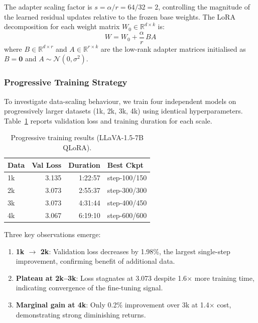 \documentclass[twocolumn]{article}
\begin{document}
The adapter scaling factor is $s = \alpha / r = 64/32 = 2$, controlling the
magnitude of the learned residual updates relative to the frozen base weights.
The LoRA decomposition for each weight matrix $W_0 \in \mathbb{R}^{d \times k}$ is:
\begin{equation}
  W = W_0 + \frac{\alpha}{r} \, B A
  \label{eq:lora}
\end{equation}
where $B \in \mathbb{R}^{d \times r}$ and $A \in \mathbb{R}^{r \times k}$ are the
low-rank adapter matrices initialised as $B = \mathbf{0}$ and $A \sim \mathcal{N}(0, \sigma^2)$.

\subsubsection{Progressive Training Strategy}
\label{sec:progressive}

To investigate data-scaling behaviour, we train four independent models on
progressively larger datasets (1k, 2k, 3k, 4k) using identical hyperparameters.
Table~\ref{tab:training_results} reports validation loss and training duration
for each scale.

\begin{table}[h]
\centering
\caption{Progressive training results (LLaVA-1.5-7B QLoRA).}
\label{tab:training_results}
\begin{tabular}{lrrl}
\toprule
\textbf{Data}& \textbf{Val Loss} & \textbf{Duration} & \textbf{Best Ckpt} \\
\midrule
1k & 3.135 & 1:22:57 & step-100/150 \\
2k & 3.073 & 2:55:37 & step-300/300 \\
3k & 3.073 & 4:31:44 & step-400/450 \\
4k & 3.067 & 6:19:10 & step-600/600 \\
\bottomrule
\end{tabular}
\end{table}

Three key observations emerge:
\begin{enumerate}[leftmargin=*,itemsep=1pt]
  \item \textbf{1k $\to$ 2k}: Validation loss decreases by 1.98\%,
        the largest single-step improvement, confirming benefit of additional data.
  \item \textbf{Plateau at 2k--3k}: Loss stagnates at 3.073 despite 1.6$\times$
        more training time, indicating convergence of the fine-tuning signal.
  \item \textbf{Marginal gain at 4k}: Only 0.2\% improvement over 3k at
        1.4$\times$ cost, demonstrating strong diminishing returns.
\end{enumerate}
\end{document}

